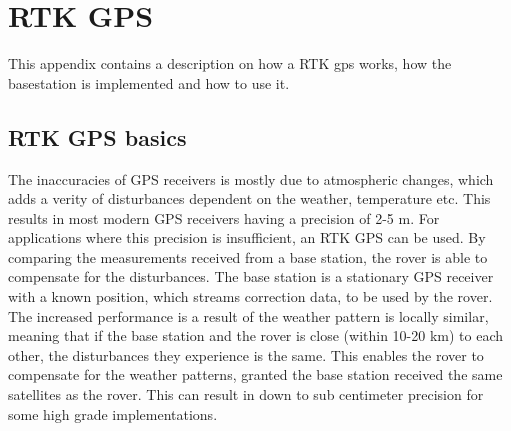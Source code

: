 \chapter{RTK GPS}\label{app:rtk_gps}
This appendix contains a description on how a RTK gps works, how the basestation is implemented and how to use it.


\section{RTK GPS basics}
The inaccuracies of GPS receivers is mostly due to atmospheric changes, which adds a verity of disturbances dependent on the weather, temperature etc.
This results in most modern GPS receivers having a precision of 2-5 m. 
For applications where this precision is insufficient, an RTK GPS can be used. 
By comparing the measurements received from a base station, the rover is able to compensate for the disturbances.
The base station is a stationary GPS receiver with a known position, which streams correction data, to be used by the rover. 
The increased performance is a result of the weather pattern is locally similar, meaning that if the base station and the rover is close (within 10-20 km) to each other, the disturbances they experience is the same.
This enables the rover to compensate for the weather patterns, granted the base station received the same satellites as the rover.
This can result in down to sub centimeter precision for some high grade implementations.

